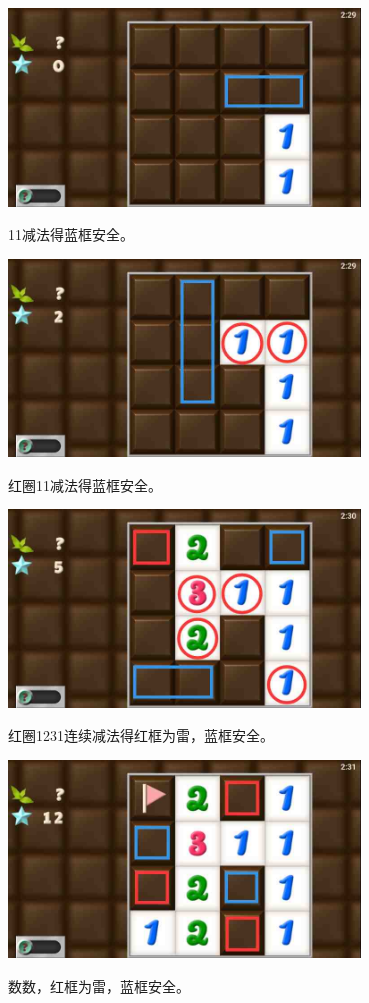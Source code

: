 \subsection{} %
\begin{center}
    \includegraphics[width=0.7\textwidth]{puzzlelow/148-1.jpg}
\end{center}
11减法得蓝框安全。
\begin{center}
    \includegraphics[width=0.7\textwidth]{puzzlelow/148-2.jpg}
\end{center}
红圈11减法得蓝框安全。
\begin{center}
    \includegraphics[width=0.7\textwidth]{puzzlelow/148-3.jpg}
\end{center}
红圈1231连续减法得红框为雷，蓝框安全。
\begin{center}
    \includegraphics[width=0.7\textwidth]{puzzlelow/148-4.jpg}
\end{center}
数数，红框为雷，蓝框安全。

